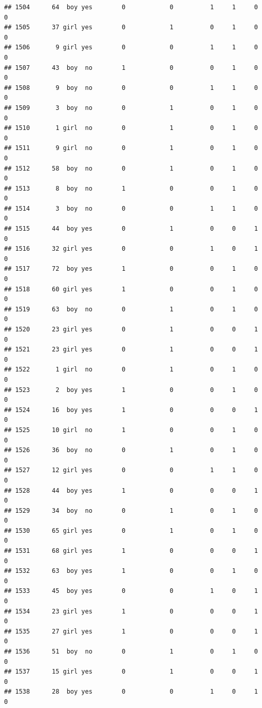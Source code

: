 \documentclass[man]{apa6}
\begin{document}
\begin{verbatim}
## 1504      64  boy yes        0            0          1     1     0     0
## 1505      37 girl yes        0            1          0     1     0     0
## 1506       9 girl yes        0            0          1     1     0     0
## 1507      43  boy  no        1            0          0     1     0     0
## 1508       9  boy  no        0            0          1     1     0     0
## 1509       3  boy  no        0            1          0     1     0     0
## 1510       1 girl  no        0            1          0     1     0     0
## 1511       9 girl  no        0            1          0     1     0     0
## 1512      58  boy  no        0            1          0     1     0     0
## 1513       8  boy  no        1            0          0     1     0     0
## 1514       3  boy  no        0            0          1     1     0     0
## 1515      44  boy yes        0            1          0     0     1     0
## 1516      32 girl yes        0            0          1     0     1     0
## 1517      72  boy yes        1            0          0     1     0     0
## 1518      60 girl yes        1            0          0     1     0     0
## 1519      63  boy  no        0            1          0     1     0     0
## 1520      23 girl yes        0            1          0     0     1     0
## 1521      23 girl yes        0            1          0     0     1     0
## 1522       1 girl  no        0            1          0     1     0     0
## 1523       2  boy yes        1            0          0     1     0     0
## 1524      16  boy yes        1            0          0     0     1     0
## 1525      10 girl  no        1            0          0     1     0     0
## 1526      36  boy  no        0            1          0     1     0     0
## 1527      12 girl yes        0            0          1     1     0     0
## 1528      44  boy yes        1            0          0     0     1     0
## 1529      34  boy  no        0            1          0     1     0     0
## 1530      65 girl yes        0            1          0     1     0     0
## 1531      68 girl yes        1            0          0     0     1     0
## 1532      63  boy yes        1            0          0     1     0     0
## 1533      45  boy yes        0            0          1     0     1     0
## 1534      23 girl yes        1            0          0     0     1     0
## 1535      27 girl yes        1            0          0     0     1     0
## 1536      51  boy  no        0            1          0     1     0     0
## 1537      15 girl yes        0            1          0     0     1     0
## 1538      28  boy yes        0            0          1     0     1     0

\end{verbatim}
\end{document}
